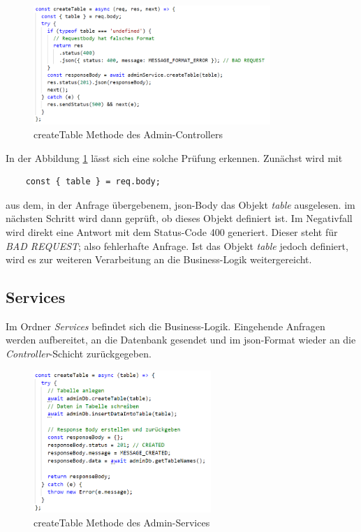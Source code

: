 \begin{figure}[h]
    \centering
    \includegraphics[width=0.8\textwidth]{figures/code-controller.png}
    \caption{createTable Methode des Admin-Controllers}
    \label{fig:createTable-controller}
\end{figure}

In der Abbildung \ref{fig:createTable-controller} lässt sich eine solche Prüfung erkennen. Zunächst wird mit
\begin{verbatim}
    const { table } = req.body;
\end{verbatim}
aus dem, in der Anfrage übergebenem, \gls{json}-Body das Objekt \textit{table} ausgelesen. im nächsten Schritt wird dann geprüft, ob dieses Objekt definiert ist. Im Negativfall wird direkt eine Antwort mit dem Status-Code 400 generiert. Dieser steht für \textit{BAD REQUEST}; also fehlerhafte Anfrage. Ist das Objekt \textit{table} jedoch definiert, wird es zur weiteren Verarbeitung an die Business-Logik weitergereicht. 
\subsection{Services}
Im Ordner \textit{Services} befindet sich die Business-Logik. Eingehende Anfragen werden aufbereitet, an die Datenbank gesendet und im \gls{json}-Format wieder an die \textit{Controller}-Schicht zurückgegeben. 

\begin{figure}[h]
    \centering
    \includegraphics[width=0.6\textwidth]{figures/code-services.png}
    \caption{createTable Methode des Admin-Services}
    \label{fig:createTable-services}
\end{figure}


